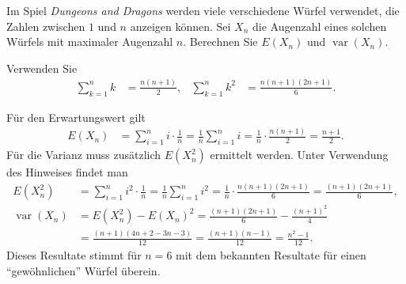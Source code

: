 Im Spiel {\it Dungeons and Dragons} werden viele verschiedene Würfel
verwendet, die Zahlen zwischen $1$ und $n$ anzeigen können. Sei $X_n$ 
die Augenzahl eines solchen Würfels mit maximaler Augenzahl $n$. 
Berechnen Sie $E(X_n)$ und $\operatorname{var}(X_n)$.

\begin{hinweis}
Verwenden Sie
\begin{align*}
\sum_{k=1}^nk&=\frac{n(n+1)}2,&
\sum_{k=1}^nk^2&=\frac{n(n+1)(2n+1)}6.
\end{align*}
\end{hinweis}

\begin{loesung}
Für den Erwartungswert gilt
\begin{align*}
E(X_n)&=\sum_{i=1}^n i\cdot \frac1n=\frac1n\sum_{i=1}^ni
=\frac1n\cdot\frac{n(n+1)}2=\frac{n+1}2.
\end{align*}
Für die Varianz muss zusätzlich $E(X_n^2)$ ermittelt werden.
Unter Verwendung des Hinweises findet man
\begin{align*}
E(X_n^2)&=\sum_{i=1}^n i^2\cdot \frac1n=\frac1n\sum_{i=1}^ni^2
=\frac1n\cdot\frac{n(n+1)(2n+1)}6
=\frac{(n+1)(2n+1)}6,\\
\operatorname{var}(X_n)&=E(X_n^2)-E(X_n)^2
=\frac{(n+1)(2n+1)}6-\frac{(n+1)^2}4\\
&=\frac{(n+1)(4n + 2 - 3n - 3)}{12}
=\frac{(n+1)(n - 1)}{12}
=\frac{n^2-1}{12}.
\end{align*}
Dieses Resultate stimmt für $n=6$ mit dem bekannten Resultate für einen
``gewöhnlichen'' Würfel überein.
\end{loesung}
